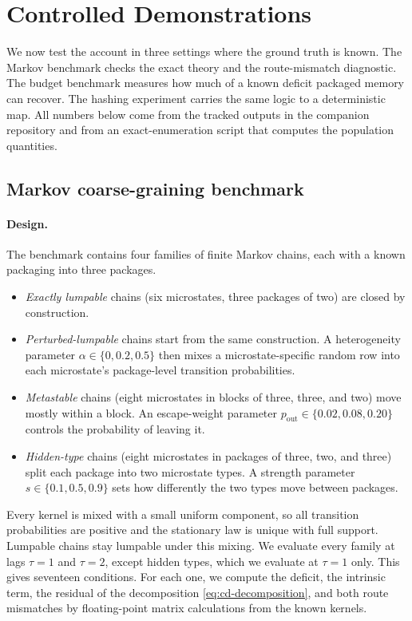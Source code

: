 \section{Controlled Demonstrations}\label{sec:results}

We now test the account in three settings where the ground truth is known. The Markov benchmark checks the exact theory and the route-mismatch diagnostic. The budget benchmark measures how much of a known deficit packaged memory can recover. The hashing experiment carries the same logic to a deterministic map. All numbers below come from the tracked outputs in the companion repository and from an exact-enumeration script that computes the population quantities.

\subsection{Markov coarse-graining benchmark}\label{sec:results-markov}

\paragraph{Design.} The benchmark contains four families of finite Markov chains, each with a known packaging into three packages.
\begin{itemize}
\item \emph{Exactly lumpable} chains (six microstates, three packages of two) are closed by construction.
\item \emph{Perturbed-lumpable} chains start from the same construction. A heterogeneity parameter $\alpha\in\{0,0.2,0.5\}$ then mixes a microstate-specific random row into each microstate's package-level transition probabilities.
\item \emph{Metastable} chains (eight microstates in blocks of three, three, and two) move mostly within a block. An escape-weight parameter $p_{\mathrm{out}}\in\{0.02,0.08,0.20\}$ controls the probability of leaving it.
\item \emph{Hidden-type} chains (eight microstates in packages of three, two, and three) split each package into two microstate types. A strength parameter $s\in\{0.1,0.5,0.9\}$ sets how differently the two types move between packages.
\end{itemize}
Every kernel is mixed with a small uniform component, so all transition probabilities are positive and the stationary law is unique with full support. Lumpable chains stay lumpable under this mixing. We evaluate every family at lags $\tau=1$ and $\tau=2$, except hidden types, which we evaluate at $\tau=1$ only. This gives seventeen conditions. For each one, we compute the deficit, the intrinsic term, the residual of the decomposition \eqref{eq:cd-decomposition}, and both route mismatches by floating-point matrix calculations from the known kernels.

